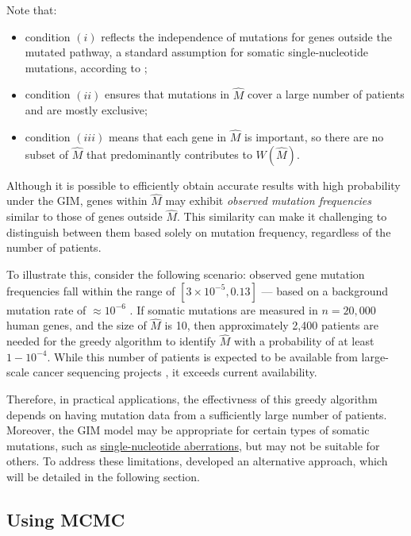 Note that:

\begin{itemize}
    \item condition $(i)$ reflects the independence of mutations for genes outside the mutated pathway, a standard assumption for somatic single-nucleotide mutations, according to \textcite{dendrix};
    \item condition $(ii)$ ensures that mutations in $\hat M$ cover a large number of patients and are mostly exclusive;
    \item condition $(iii)$ means that each gene in $\hat M$ is important, so there are no subset of $\hat M$ that predominantly contributes to $W(\hat M)$.
\end{itemize}

Although it is possible to efficiently obtain accurate results with high probability under the GIM, genes within $\hat M$ may exhibit \textit{observed mutation frequencies} similar to those of genes outside $\hat M$. This similarity can make it challenging to distinguish between them based solely on mutation frequency, regardless of the number of patients.

To illustrate this, consider the following scenario: observed gene mutation frequencies fall within the range of $[3 \times 10^{-5}, 0.13]$ --- based on a background mutation rate of $\approx 10^{-6}$ \cite{tcga}. If somatic mutations are measured in $n = 20,000$ human genes, and the size of $\hat M$ is 10, then approximately 2,400 patients are needed for the greedy algorithm to identify $\hat M$ with a probability of at least $1 - 10^{-4}$. While this number of patients is expected to be available from large-scale cancer sequencing projects \cite{icgc}, it exceeds current availability.

Therefore, in practical applications, the effectivness of this greedy algorithm depends on having mutation data from a sufficiently large number of patients. Moreover, the GIM model may be appropriate for certain types of somatic mutations, such as \href{https://en.wikipedia.org/wiki/Single-nucleotide_polymorphism}{single-nucleotide aberrations}, but may not be suitable for others. To address these limitations, \textcite{dendrix} developed an alternative approach, which will be detailed in the following section.

\subsection{Using MCMC} \label{using_mcmc}

